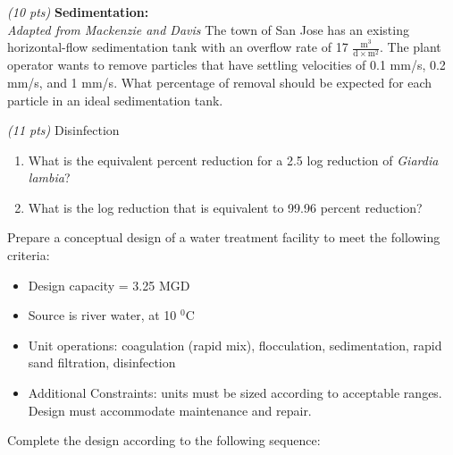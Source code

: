 \item \emph{(10 pts)} \textbf{Sedimentation:}\\
\emph{Adapted from Mackenzie and Davis} The town of San Jose has an existing horizontal-flow sedimentation tank with an overflow rate of 17 $\mathrm{\frac{m^3}{d\times m^2}}$.  The plant operator wants to remove particles that have settling velocities of 0.1 mm/s, 0.2 mm/s, and 1 mm/s.  What percentage of removal should be expected for each particle in an ideal sedimentation tank.

\item \emph{(11 pts)} Disinfection
\begin{enumerate}
\item What is the equivalent percent reduction for a 2.5 log reduction of \emph{Giardia lambia}? 

\item What is the log reduction that is equivalent to 99.96 percent reduction?
\end{enumerate}	

\item Prepare a conceptual design of a water treatment facility to meet the following criteria:

\begin{itemize}
\item Design capacity = 3.25 MGD
\item Source is river water, at 10 $^0$C
\item Unit operations: coagulation (rapid mix), flocculation, sedimentation, rapid sand filtration, disinfection
\item Additional Constraints: units must be sized according to acceptable ranges.  Design must accommodate maintenance and repair.

\end{itemize}

Complete the design according to the following sequence: